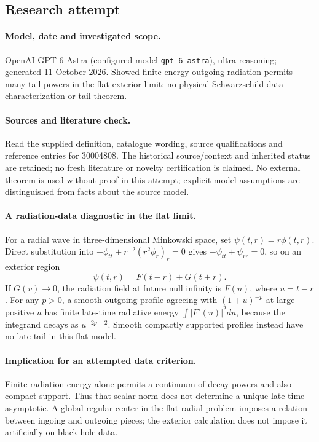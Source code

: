 \documentclass[11pt]{article}
\begin{document}
\subsection{Research attempt}
\paragraph{Model, date and investigated scope.}
OpenAI GPT-6 Astra (configured model \texttt{gpt-6-astra}), ultra reasoning; generated 11 October 2026. Showed finite-energy outgoing radiation permits many tail powers in the flat exterior limit; no physical Schwarzschild-data characterization or tail theorem.

\paragraph{Sources and literature check.}
Read the supplied definition, catalogue wording, source qualifications and reference entries for 30004808. The historical source/context and inherited status are retained; no fresh literature or novelty certification is claimed. No external theorem is used without proof in this attempt; explicit model assumptions are distinguished from facts about the source model.

\paragraph{A radiation-data diagnostic in the flat limit.} For a radial wave in three-dimensional Minkowski space, set \(\psi(t,r)=r\phi(t,r)\). Direct substitution into \(-\phi_{tt}+r^{-2}(r^2\phi_r)_r=0\) gives \(-\psi_{tt}+\psi_{rr}=0\), so on an exterior region
\[
 \psi(t,r)=F(t-r)+G(t+r).
\]
If \(G(v)\to0\), the radiation field at future null infinity is \(F(u)\), where \(u=t-r\). For any \(p>0\), a smooth outgoing profile agreeing with \((1+u)^{-p}\) at large positive \(u\) has finite late-time radiative energy \(\int|F'(u)|^2du\), because the integrand decays as \(u^{-2p-2}\). Smooth compactly supported profiles instead have no late tail in this flat model.
\paragraph{Implication for an attempted data criterion.} Finite radiation energy alone permits a continuum of decay powers and also compact support. Thus that scalar norm does not determine a unique late-time asymptotic. A global regular center in the flat radial problem imposes a relation between ingoing and outgoing pieces; the exterior calculation does not impose it artificially on black-hole data.
\end{document}
